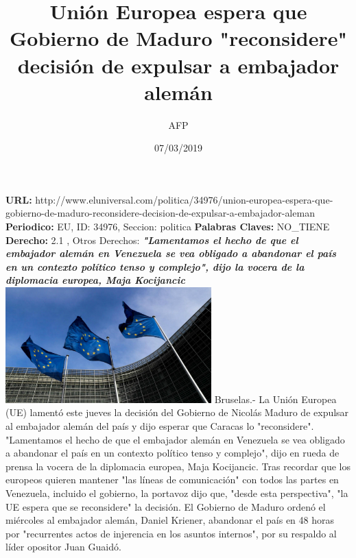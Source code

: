 \documentclass{article}%
\title{\textbf{Unión Europea espera que Gobierno de Maduro "reconsidere" decisión de expulsar a embajador alemán}}%
\author{AFP}%
\date{07/03/2019}%
\begin{document}
%
\normalsize%
\maketitle%
\textbf{URL: }%
http://www.eluniversal.com/politica/34976/union{-}europea{-}espera{-}que{-}gobierno{-}de{-}maduro{-}reconsidere{-}decision{-}de{-}expulsar{-}a{-}embajador{-}aleman\newline%
%
\textbf{Periodico: }%
EU, %
ID: %
34976, %
Seccion: %
politica\newline%
%
\textbf{Palabras Claves: }%
NO\_TIENE\newline%
%
\textbf{Derecho: }%
2.1%
, Otros Derechos: %
\newline%
%
\textbf{\textit{"Lamentamos el hecho de que el embajador alemán en Venezuela se vea obligado a abandonar el país en un contexto político tenso y complejo", dijo la vocera de la diplomacia europea, Maja Kocijancic}}%
\newline%
\newline%
%
\includegraphics[width=300px]{EU_34976.jpg}%
\newline%
%
Bruselas.{-} La Unión Europea (UE) lamentó este jueves la decisión del Gobierno de Nicolás Maduro de expulsar al embajador alemán del país y dijo esperar que Caracas lo "reconsidere".%
\newline%
%
"Lamentamos el hecho de que el embajador alemán en Venezuela se vea obligado a abandonar el país en un contexto político tenso y complejo", dijo en rueda de prensa la vocera de la diplomacia europea, Maja Kocijancic.%
\newline%
%
Tras recordar que los europeos quieren mantener "las líneas de comunicación" con todos las partes en Venezuela, incluido el gobierno, la portavoz dijo que, "desde esta perspectiva", "la UE espera que se reconsidere" la decisión.%
\newline%
%
El Gobierno de Maduro ordenó el miércoles al embajador alemán, Daniel Kriener, abandonar el país en 48 horas por "recurrentes actos de injerencia en los asuntos internos", por su respaldo al líder opositor Juan Guaidó.%
\end{document}
